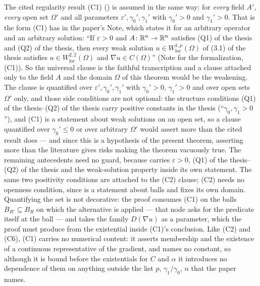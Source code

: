 \begin{theorem}[Theorem 2]
The cited regularity result (C1) () is assumed in
the same way: for \emph{every} field $A'$, \emph{every} open set $\Omega'$ and
all parameters $\varepsilon',\gamma_0',\gamma_1'$ with
$\gamma_0'>0$ and $\gamma_1'>0$.  That is the form (C1) has in the
paper's Note, which states it for an arbitrary operator and an arbitrary
solution: ``If $\varepsilon>0$ and $A\colon\mathbb{R}^n\to\mathbb{R}^n$ satisfies
(Q1) of the thesis and (Q2) of the thesis, then every weak solution
$u\in W^{1,p}_{\mathrm{loc}}(\Omega)$ of (3.1) of the thesis satisfies
$u\in W^{2,2}_{\mathrm{loc}}(\Omega)$ and $\nabla u\in C(\Omega)$'' (Note for the
formalization, (C1)).  So the universal clause is the faithful transcription and
a clause attached only to the field $A$ and the domain $\Omega$ of this theorem
would be the weakening.  The clause is quantified over
$\varepsilon',\gamma_0',\gamma_1'$ with $\gamma_0'>0$, $\gamma_1'>0$ and over
open sets $\Omega'$ only, and those side conditions are not optional: the
structure conditions (Q1) of the thesis--(Q2) of the thesis carry positive constants in
the thesis (``$\gamma_0,\gamma_1>0$''), and (C1) is a statement about weak
solutions on an open set, so a clause quantified over $\gamma_0'\le0$ or over
arbitrary $\Omega'$ would assert more than the cited result does --- and since
this is a hypothesis of the present theorem, asserting more than the literature
gives risks making the theorem vacuously true.  The remaining antecedents need
no guard, because  carries $\varepsilon>0$,
(Q1) of the thesis--(Q2) of the thesis and the weak-solution property inside its own
statement.  The same two positivity conditions are attached to the (C2) clause;
(C2) needs no openness condition, since  is a
statement about balls and fixes its own domain.  Quantifying the set is not decorative: the proof consumes (C1) on
the balls $B_{R'}\subseteq B_R$ on which the alternative
 is applied --- that node asks for the predicate
itself at the ball --- and  takes the family
$D(\nabla u)$ as a parameter, which the proof must produce from the existential
inside (C1)'s conclusion.  Like (C2) and (C6), (C1) carries no numerical
content: it asserts membership and the existence of a continuous representative
of the gradient, and names no constant, so although
it is bound before the existentials for $C$ and $\alpha$ it introduces no
dependence of them on anything outside the list $p$, $\gamma_1/\gamma_0$, $n$
that the paper names.
\end{theorem}

